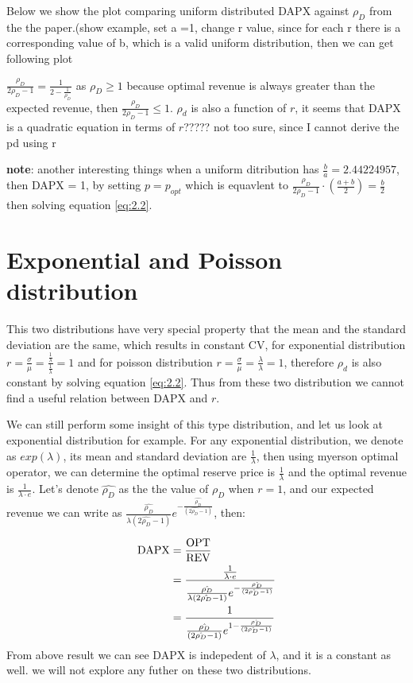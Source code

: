 Below we show the plot comparing uniform distributed DAPX against $\rho_D$ from the the paper.(show example, set a =1, change r value, since for each r there is a corresponding value of b, which is a valid uniform distribution, then we can get following plot


$ \frac{ \rho_{D}}{2\rho_{D}-1} = \frac{1}{2-\frac{1}{\rho_D}}$ as $\rho_D \geqslant 1$ because optimal revenue is always greater than the expected revenue, then $\frac{ \rho_{D}}{2\rho_{D}-1} \leqslant 1$. 
$\rho_d$ is also a function of $r$, it seems that DAPX is a quadratic equation in terms of $r$????? not too sure, since I cannot derive the pd using r

\textbf{note}: another interesting things when a uniform ditribution has $\frac{b}{a} = 2.44224957$, then DAPX = 1, by setting $p = p_{opt} $ which is equavlent to $\frac{\rho_{D}}{2\rho_{D}-1}\cdot (\frac{a+b}{2}) = \frac{b}{2}$ then solving equation \ref{eq:2.2}.


\section{Exponential and Poisson distribution}

This two distributions have very special property that the mean and the standard deviation are the same, which results in constant CV, for exponential distribution $r = \frac{\sigma}{\mu} = \frac{\frac{1}{\lambda}}{\frac{1}{\lambda}} = 1$ and for poisson distribution $r = \frac{\sigma}{\mu} = \frac{\lambda}{\lambda} = 1$, therefore $\rho_d$ is also constant by solving equation \ref{eq:2.2}. Thus from these two distribution we cannot find a useful relation between DAPX and $r$. 

We can still perform some insight of this type distribution, and let us look at exponential distribution for example. For any exponential distribution, we denote as $exp(\lambda)$, its mean and standard deviation are $\frac{1}{\lambda}$, then using myerson optimal operator, we can determine the optimal reserve price is $\frac{1}{\lambda}$ and the optimal revenue is $\frac{1}{\lambda \cdot e}$. Let's denote $\hat{\rho_D}$ as the the value of $\rho_D$ when $r = 1$, and our expected revenue we can write as $\frac{\hat{\rho_D}}{\lambda (2\hat{\rho_D} - 1)}e^{- \frac{\hat{\rho_D}}{(2\hat{\rho_D} - 1)}}$, then:

\begin{equation}\notag
\begin{split}	
	\text{DAPX} &= \frac{\text{OPT}}{\text{REV}} \\&= \frac{\frac{1}{\lambda \cdot e}}{\frac{\hat{\rho_D}}{\lambda (2\hat{\rho_D} - 1)}e^{- \frac{\hat{\rho_D}}{(2\hat{\rho_D} - 1)}}} \\&= \frac{1}{\frac{\hat{\rho_D}}{(2\hat{\rho_D} - 1)}e^{1- \frac{\hat{\rho_D}}{(2\hat{\rho_D} - 1)}}}
\end{split}
\end{equation} 
From above result we can see DAPX is indepedent of $\lambda$, and it is a constant as well. 
we will not explore any futher on these two distributions.


